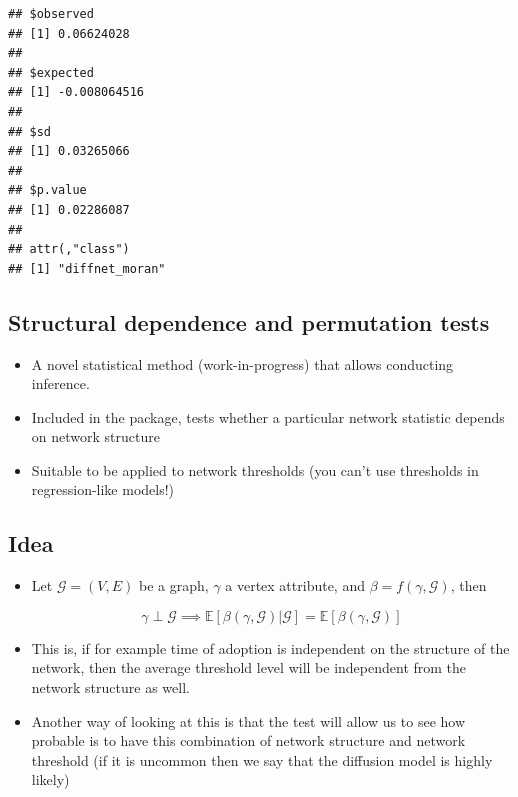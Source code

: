 \documentclass[
]{book}
\newenvironment{Shaded}{\begin{snugshade}}{\end{snugshade}}
\newcommand{\CommentTok}[1]{\textcolor[rgb]{0.56,0.35,0.01}{\textit{#1}}}
\newcommand{\DecValTok}[1]{\textcolor[rgb]{0.00,0.00,0.81}{#1}}
\newcommand{\FunctionTok}[1]{\textcolor[rgb]{0.13,0.29,0.53}{\textbf{#1}}}
\newcommand{\NormalTok}[1]{#1}
\newcommand{\OtherTok}[1]{\textcolor[rgb]{0.56,0.35,0.01}{#1}}
\newcommand{\SpecialCharTok}[1]{\textcolor[rgb]{0.81,0.36,0.00}{\textbf{#1}}}
\providecommand{\tightlist}{%
  \setlength{\itemsep}{0pt}\setlength{\parskip}{0pt}}
\begin{document}
\begin{itemize}
\begin{Shaded}
\end{Shaded}

\begin{verbatim}
## $observed
## [1] 0.06624028
## 
## $expected
## [1] -0.008064516
## 
## $sd
## [1] 0.03265066
## 
## $p.value
## [1] 0.02286087
## 
## attr(,"class")
## [1] "diffnet_moran"
\end{verbatim}
\end{itemize}

\hypertarget{structural-dependence-and-permutation-tests}{%
\subsection{Structural dependence and permutation tests}\label{structural-dependence-and-permutation-tests}}

\begin{itemize}
\tightlist
\item
  A novel statistical method (work-in-progress) that allows conducting inference.
\item
  Included in the package, tests whether a particular network statistic depends on network structure
\item
  Suitable to be applied to network thresholds (you can't use thresholds in regression-like models!)
\end{itemize}

\hypertarget{idea}{%
\subsection{Idea}\label{idea}}

\begin{itemize}
\item
  Let \(\mathcal{G} = (V,E)\) be a graph, \(\gamma\) a vertex attribute, and \(\beta = f(\gamma,\mathcal{G})\), then

  \[\gamma \perp \mathcal{G} \implies \mathbb{E}\left[\beta(\gamma,\mathcal{G})|\mathcal{G}\right] = \mathbb{E}\left[\beta(\gamma,\mathcal{G})\right]\]
\item
  This is, if for example time of adoption is independent on the structure of the network, then the average threshold level will be independent from the network structure as well.
\item
  Another way of looking at this is that the test will allow us to see how probable is to have this combination of network structure and network threshold (if it is uncommon then we say that the diffusion model is highly likely)
\end{itemize}
\end{document}
